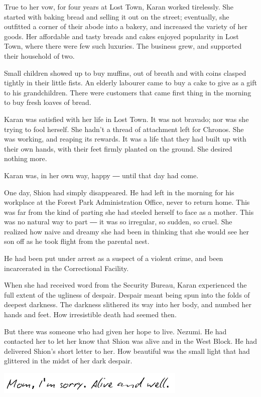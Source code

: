 True to her vow, for four years at Lost Town, Karan worked tirelessly.
She started with baking bread and selling it out on the street;
eventually, she outfitted a corner of their abode into a bakery, and
increased the variety of her goods. Her affordable and tasty breads and
cakes enjoyed popularity in Lost Town, where there were few such
luxuries. The business grew, and supported their household of two.

Small children showed up to buy muffins, out of breath and with coins
clasped tightly in their little fists. An elderly labourer came to buy a
cake to give as a gift to his grandchildren. There were customers that
came first thing in the morning to buy fresh loaves of bread.

Karan was satisfied with her life in Lost Town. It was not bravado; nor
was she trying to fool herself. She hadn't a thread of attachment left
for Chronos. She was working, and reaping its rewards. It was a life
that they had built up with their own hands, with their feet firmly
planted on the ground. She desired nothing more.

Karan was, in her own way, happy ― until that day had come.

One day, Shion had simply disappeared. He had left in the morning for
his workplace at the Forest Park Administration Office, never to return
home. This was far from the kind of parting she had steeled herself to
face as a mother. This was no natural way to part ― it was so irregular,
so sudden, so cruel. She realized how naive and dreamy she had been in
thinking that she would see her son off as he took flight from the
parental nest.

He had been put under arrest as a suspect of a violent crime, and been
incarcerated in the Correctional Facility.

When she had received word from the Security Bureau, Karan experienced
the full extent of the ugliness of despair. Despair meant being spun
into the folds of deepest darkness. The darkness slithered its way into
her body, and numbed her hands and feet. How irresistible death had
seemed then.

But there was someone who had given her hope to live. Nezumi. He had
contacted her to let her know that Shion was alive and in the West
Block. He had delivered Shion's short letter to her. How beautiful was
the small light that had glittered in the midst of her dark despair.

\includegraphics{Images/memo3.png}\\


